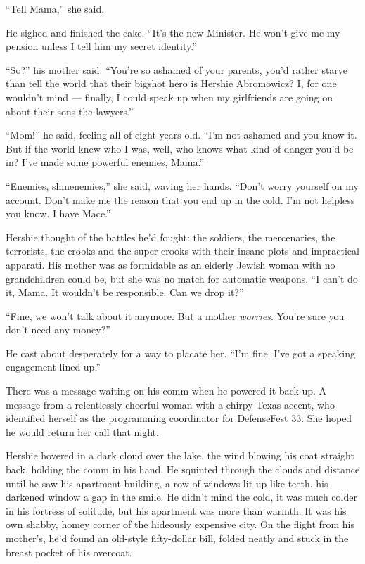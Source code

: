 ``Tell Mama,'' she said.

He sighed and finished the cake.
``It's the new Minister. He won't give me my pension unless I tell him my 
secret identity.''

``So?'' his mother said.
``You're so ashamed of your parents, you'd rather starve than tell the world 
that their bigshot hero is Hershie Abromowicz? I, for one wouldn't mind --- 
finally, I could speak up when my girlfriends are going on about their sons the 
lawyers.''

``Mom!'' he said, feeling all of eight years old.
``I'm not ashamed and you know it. But if the world knew who I was, well, who 
knows what kind of danger you'd be in? I've made some powerful enemies, Mama.''

``Enemies, shmenemies,'' she said, waving her hands.
``Don't worry yourself on my account. Don't make me the reason that you end up 
in the cold. I'm not helpless you know. I have Mace.''

Hershie thought of the battles he'd fought: the soldiers, the
mercenaries, the terrorists, the crooks and the super-crooks with
their insane plots and impractical apparati. His mother was as
formidable as an elderly Jewish woman with no grandchildren could
be, but she was no match for automatic weapons.
``I can't do it, Mama. It wouldn't be responsible. Can we drop it?''

``Fine, we won't talk about it anymore. But a mother \emph{worries}. You're 
sure you don't need any money?''

He cast about desperately for a way to placate her.
``I'm fine. I've got a speaking engagement lined up.''

\tb

There was a message waiting on his comm when he powered it back up.
A message from a relentlessly cheerful woman with a chirpy Texas
accent, who identified herself as the programming coordinator for
DefenseFest 33. She hoped he would return her call that night.

Hershie hovered in a dark cloud over the lake, the wind blowing his
coat straight back, holding the comm in his hand. He squinted
through the clouds and distance until he saw his apartment
building, a row of windows lit up like teeth, his darkened window a
gap in the smile. He didn't mind the cold, it was much colder in
his fortress of solitude, but his apartment was more than warmth.
It was his own shabby, homey corner of the hideously expensive
city. On the flight from his mother's, he'd found an old-style
fifty-dollar bill, folded neatly and stuck in the breast pocket of
his overcoat.

